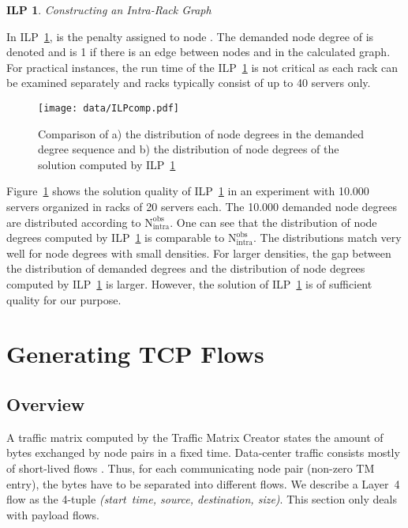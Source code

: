 \documentclass[journal,10pt]{IEEEtran}
\newtheorem{ilp}{ILP}
\newcommand{\lf}{Layer~4}
\newcommand{\partners}[2]{\ensuremath{\mathrm{N}^{\mathrm{#1}}_{\mathrm{#2}}}}
\begin{document}
		\begin{ilp}{Constructing an Intra-Rack Graph}
			
			\label{ilp:intra-rack}
		\end{ilp}
		
		In ILP~\ref{ilp:intra-rack},  is the penalty assigned to node . The demanded node degree of  is denoted  and
		 is 1 if there is an edge between nodes  and  in the calculated graph.
		For practical instances, the run time of the ILP~\ref{ilp:intra-rack} is not critical as each rack can be examined separately 
		and racks typically consist of up to 40 servers only.
		
\begin{figure}
	\centering
	\texttt{[image: data/ILPcomp.pdf]}
	\caption{Comparison of a) the distribution of node degrees in the demanded degree sequence and b) the distribution of node degrees of the
	solution computed by ILP~\ref{ilp:intra-rack}}

	\label{fig:ILPcomp}
\end{figure}

		Figure~\ref{fig:ILPcomp} shows the solution quality of ILP~\ref{ilp:intra-rack} in an experiment with 10.000 servers organized in racks 
		of 20 servers each. 
		The 10.000 demanded node degrees are distributed according to \partners{obs}{intra}.
		One can see that the distribution of node degrees computed by ILP~\ref{ilp:intra-rack} is comparable to \partners{obs}{intra}.
		The distributions match very well for node degrees with small densities.
		For larger densities, the gap between the distribution of demanded degrees and the distribution of
		node degrees computed by ILP~\ref{ilp:intra-rack} is larger.
		However, the solution of ILP~\ref{ilp:intra-rack} is of sufficient quality for our purpose.
		
		
		
		


		
		

\section{Generating TCP Flows}
\label{sec:flows}
\subsection{Overview}
	A traffic matrix computed by the Traffic Matrix Creator states the amount of bytes exchanged by node pairs in a fixed time.
	Data-center traffic consists mostly of short-lived flows \cite{MSR-datacenters, datacentersInTheWild}.
	Thus, for each communicating node pair (non-zero TM entry), the bytes have to be separated into different flows.
We describe a \lf{} flow as the 4-tuple \emph{(start~time, source, destination, size)}.
	This section only deals with payload flows.
	
\end{document}

